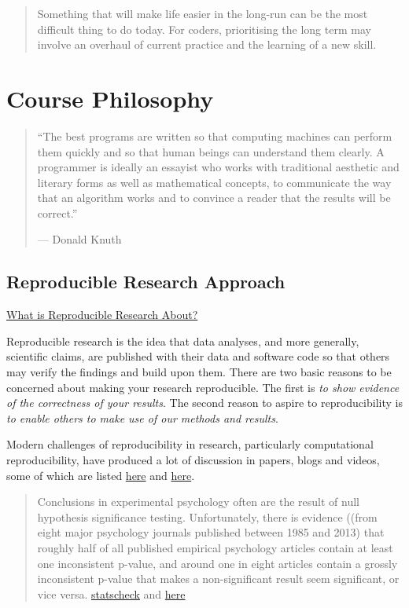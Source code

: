 \documentclass[]{book}
\theoremstyle{definition}
\theoremstyle{definition}
\theoremstyle{definition}
\theoremstyle{remark}
\begin{document}
\begin{quote}
Something that will make life easier in the long-run can be the most
difficult thing to do today. For coders, prioritising the long term may
involve an overhaul of current practice and the learning of a new skill.
\end{quote}

\section{Course Philosophy}\label{course-philosophy}

\begin{quote}
``The best programs are written so that computing machines can perform
them quickly and so that human beings can understand them clearly. A
programmer is ideally an essayist who works with traditional aesthetic
and literary forms as well as mathematical concepts, to communicate the
way that an algorithm works and to convince a reader that the results
will be correct.''

--- Donald Knuth
\end{quote}

\subsection{Reproducible Research
Approach}\label{reproducible-research-approach}

\href{https://www.coursera.org/learn/reproducible-research/lecture/FvOGB/what-is-reproducible-research-about}{What
is Reproducible Research About?}

Reproducible research is the idea that data analyses, and more
generally, scientific claims, are published with their data and software
code so that others may verify the findings and build upon them. There
are two basic reasons to be concerned about making your research
reproducible. The first is \emph{to show evidence of the correctness of
your results}. The second reason to aspire to reproducibility is
\emph{to enable others to make use of our methods and results}.

Modern challenges of reproducibility in research, particularly
computational reproducibility, have produced a lot of discussion in
papers, blogs and videos, some of which are listed
\href{http://ropensci.github.io/reproducibility-guide/sections/references/}{here}
and \href{https://reproducibleresearch.net/}{here}.

\begin{quote}
Conclusions in experimental psychology often are the result of null
hypothesis significance testing. Unfortunately, there is evidence ((from
eight major psychology journals published between 1985 and 2013) that
roughly half of all published empirical psychology articles contain at
least one inconsistent p-value, and around one in eight articles contain
a grossly inconsistent p-value that makes a non-significant result seem
significant, or vice versa.
\href{https://mbnuijten.com/statcheck/}{statscheck} and
\href{http://blog.revolutionanalytics.com/2016/10/statcheck.html}{here}
\end{quote}
\end{document}

